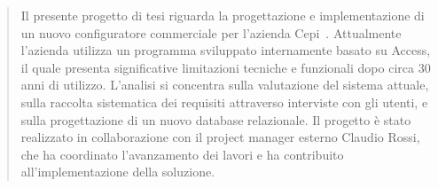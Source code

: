 \begin{abstract}
Il presente progetto di tesi riguarda la progettazione e implementazione di un nuovo configuratore commerciale per l'azienda Cepi~\cite{Cepi}. 
Attualmente l'azienda utilizza un programma sviluppato internamente basato su Access, il quale presenta significative limitazioni tecniche e funzionali dopo circa 30 anni di utilizzo. 
L'analisi si concentra sulla valutazione del sistema attuale, sulla raccolta sistematica dei requisiti attraverso interviste con gli utenti, e sulla progettazione di un nuovo database relazionale.
Il progetto è stato realizzato in collaborazione con il project manager esterno Claudio Rossi, che ha coordinato l'avanzamento dei lavori e ha contribuito all'implementazione della soluzione.
\end{abstract}